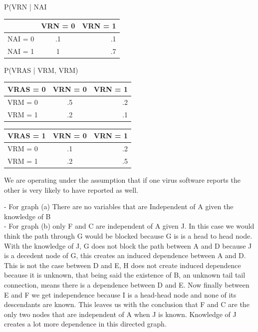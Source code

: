 \documentclass[solution, letterpaper]{cs121}
\begin{document}
\begin{empfile}
P(VRN | NAI\\
\begin{center}
\begin{tabular}{ l |c r }
   & VRN = 0 & VRN = 1 \\
   \hline
  NAI = 0 & .1 & .1 \\
  NAI = 1 & 1 & .7 \\
\end{tabular}
\end{center}


P(VRAS | VRM, VRM)\\
\begin{center}
\begin{tabular}{ l |c r }
   VRAS = 0 & VRN = 0& VRN = 1 \\
   \hline
  VRM = 0 & .5 & .2 \\
  VRM = 1 & .2 & .1 \\
\end{tabular}
\end{center}

\begin{center}
\begin{tabular}{ l |c r }
   VRAS = 1 & VRN = 0 & VRN = 1 \\
   \hline
  VRM = 0 & .1 & .2 \\
  VRM = 1 & .2 & .5 \\
\end{tabular}
\end{center}
We are operating under the assumption that if one virus software reports the other is very likely to have reported as well.

\subproblem 
- For graph (a) There are no variables that are Independent of A given the knowledge of B\\

- For graph (b) only F and C are independent of A given J. In this case we would think the path through G would be blocked because G is is a head to head node. With the knowledge of J, G does not block the path between A and D because J is a decedent node of G, this creates an induced dependence between A and D. This is not the case between D and E, H does not create induced dependence because it is unknown, that being said the existence of B, an unknown tail tail connection, means there is a dependence between D and E. Now finally between E and F we get independence because I is a head-head node and none of its descendants are known. This leaves us with the conclusion that F and C are the only two nodes that are independent of A when J is known. Knowledge of J creates a lot more dependence in this directed graph.


\end{empfile}
\end{document}
